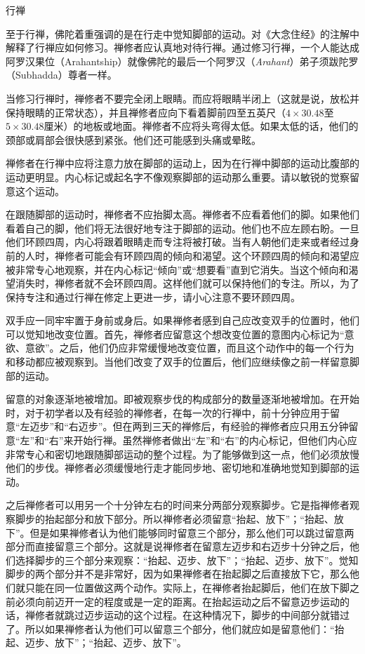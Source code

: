 \sssubsectnonib 行禅

至于行禅，佛陀着重强调的是在行走中觉知脚部的运动。对《大念住经》的注解中解释了行禅应如何修习。禅修者应认真地对待行禅。通过修习行禅，一个人能达成阿罗汉果位（Arahantship）就像\1佛陀的最后一个阿罗汉（{\it Arahant}）弟子须跋陀罗（Subhadda）尊者一样。

当修习行禅时，禅修者不要完全闭上眼睛。而应将眼睛半闭上（这就是说，放松并保持眼睛的正常状态），并且禅修者应向下看着脚前四至五英尺（$4\times 30.48$至$5\times 30.48$厘米）的地板或地面。禅修者不应将头弯得太低。如果太低的话，他们的颈部或肩部会很快感到紧张。他们还可能感到头痛或晕眩。

禅修者在行禅中应将注意力放在脚部的运动上，因为在行禅中脚部的运动比腹部的运动更明显。内心标记或起名字不像观察脚部的运动那么重要。请以敏锐的觉察留意这个运动。

在跟随脚部的运动时，禅修者不应抬脚太高。禅修者不应看着他们的脚。如果他们看着自己的脚，他们将无法很好地专注于脚部的运动。他们也不应左顾右盼。一旦他们环顾四周，内心将跟着眼睛走而专注将被打破。当有人朝他们走来或者经过身前的人时，禅修者可能会有环顾四周的倾向和渴望。这个环顾四周的倾向和渴望应被非常专心地观察，并在内心标记“倾向”或“想要看”直到它消失。当这个倾向和渴望消失时，禅修者就不会环顾四周。这样他们就可以保持他们的专注。所以，为了保持专注和通过行禅在修定上更进一步，请小心注意不要环顾四周。

\1双手应一同牢牢置于身前或身后。如果禅修者感到自己应改变双手的位置时，他们可以觉知地改变位置。首先，禅修者应留意这个想改变位置的意图内心标记为“意欲、意欲”。之后，他们仍应非常缓慢地改变位置，而且这个动作中的每一个行为和移动都应被观察到。当他们改变了双手的位置后，他们应继续像之前一样留意脚部的运动。

留意的对象逐渐地被增加。即被观察步伐的构成部分的数量逐渐地被增加。在开始时，对于初学者以及有经验的禅修者，在每一次的行禅中，前十分钟应用于留意“左迈步”和“右迈步”。但在两到三天的禅修后，有经验的禅修者应只用五分钟留意“左”和“右”来开始行禅。虽然禅修者做出“左”和“右”的内心标记，但他们内心应非常专心和密切地跟随脚部运动的整个过程。为了能够做到这一点，他们必须放慢他们的步伐。禅修者必须缓慢地行走才能同步地、密切地和准确地觉知到脚部的运动。

之后禅修者可以用另一个十分钟左右的时间来分两部分观察脚步。它是指禅修者观察脚步的抬起部分和放下部分。所以禅修者必须留意“抬起、放下”；“抬起、放下”。但是如果禅修者认为他们能够同时留意三个部分，那么他们可以跳过留意两部分而直接留意三个部分。这就是说禅修者在留意左迈步和右迈步十分钟之后，他们选择\1脚步的三个部分来观察：“抬起、迈步、放下”；“抬起、迈步、放下”。觉知脚步的两个部分并不是非常好，因为如果禅修者在抬起脚之后直接放下它，那么他们就只能在同一位置做这两个动作。实际上，在禅修者抬起脚后，他们在放下脚之前必须向前迈开一定的程度或是一定的距离。在抬起运动之后不留意迈步运动的话，禅修者就跳过迈步运动的这个过程。在这种情况下，脚步的中间部分就错过了。所以如果禅修者认为他们可以留意三个部分，他们就应如是留意他们：“抬起、迈步、放下”；“抬起、迈步、放下”。

